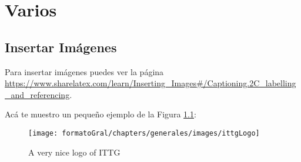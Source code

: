 \chapter{Varios}

\section{Insertar Imágenes}
Para insertar imágenes puedes ver la página \url{https://www.sharelatex.com/learn/Inserting_Images#/Captioning.2C_labelling_and_referencing}.

Acá te muestro un pequeño ejemplo de la Figura \ref{fig:ittgLogo}:

\begin{figure}[htb]
    \centering
    \texttt{[image: formatoGral/chapters/generales/images/ittgLogo]}
    \caption{A very nice logo of ITTG}
    \label{fig:ittgLogo}
\end{figure}